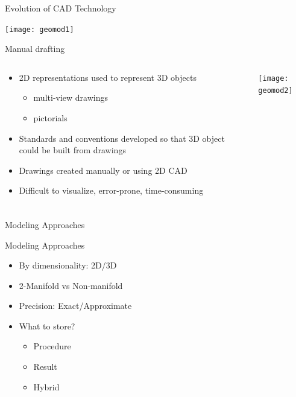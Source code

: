 \begin{frame}[fragile]{Evolution of CAD Technology}
\begin{center}
\texttt{[image: geomod1]}
\end{center}
\end{frame}

\begin{frame}[fragile]{Manual drafting}
 \begin{columns}
  \begin{column}{0.55\linewidth}
\begin{itemize}
\item 2D representations used to represent 3D objects
\begin{itemize}
\item multi-view drawings
\item pictorials
\end{itemize}
\item Standards and conventions developed so that 3D object could be built from drawings
\item Drawings created manually or using 2D CAD
\item Difficult to visualize, error-prone, time-consuming
\end{itemize}
  \end{column}%
  \begin{column}{0.45\linewidth}
			\begin{center}
			\texttt{[image: geomod2]}
			\end{center}
  \end{column}
 \end{columns}
\end{frame}



\begin{frame}[fragile]\frametitle{}
\begin{center}
{\Large Modeling Approaches}
\end{center}
\end{frame}



\begin{frame}[fragile]{Modeling Approaches}

\begin{itemize}
\item By dimensionality: 2D/3D
\item 2-Manifold vs Non-manifold
\item Precision: Exact/Approximate
\item What to store?
	\begin{itemize}
	\item Procedure
	\item Result
	\item Hybrid
	\end{itemize}
\end{itemize}
\end{frame}

